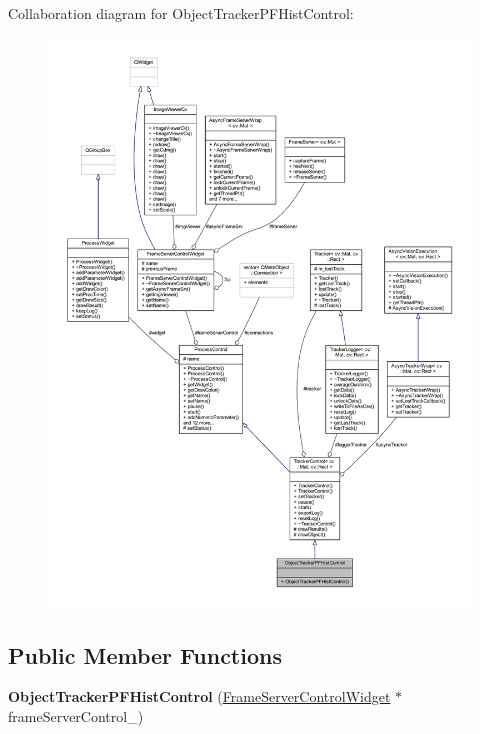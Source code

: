 Collaboration diagram for Object\+Tracker\+P\+F\+Hist\+Control\+:
\nopagebreak
\begin{figure}[H]
\begin{center}
\leavevmode
\includegraphics[width=350pt]{class_object_tracker_p_f_hist_control__coll__graph}
\end{center}
\end{figure}
\subsection*{Public Member Functions}
\begin{DoxyCompactItemize}
\item 
\hypertarget{class_object_tracker_p_f_hist_control_aa8743603bca7cc548c78d61d45fc013e}{}{\bfseries Object\+Tracker\+P\+F\+Hist\+Control} (\hyperlink{class_frame_server_control_widget}{Frame\+Server\+Control\+Widget} $\ast$frame\+Server\+Control\+\_\+)\label{class_object_tracker_p_f_hist_control_aa8743603bca7cc548c78d61d45fc013e}

\end{DoxyCompactItemize}
